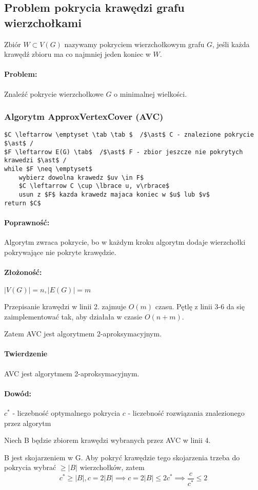 \subsection{Problem pokrycia krawędzi grafu wierzchołkami}
Zbiór $W \subset V(G)$ nazywamy pokryciem wierzchołkowym grafu $G$, jeśli każda krawędź zbioru ma co najmniej jeden koniec w $W$.

\paragraph{Problem: }Znaleźć pokrycie wierzchołkowe $G$ o minimalnej wielkości.

\subsubsection{Algorytm ApproxVertexCover (AVC)}
\begin{lstlisting}[caption={AVC(G)}]
$C \leftarrow \emptyset \tab \tab $  /$\ast$ C - znalezione pokrycie $\ast$ /
$F \leftarrow E(G) \tab$  /$\ast$ F - zbior jeszcze nie pokrytych krawedzi $\ast$ /
while $F \neq \emptyset$
	wybierz dowolna krawedz $uv \in F$
	$C \leftarrow C \cup \lbrace u, v\rbrace$
	usun z $F$ kazda krawedz majaca koniec w $u$ lub $v$
return $C$
\end{lstlisting}

\paragraph{Poprawność: } Algorytm zwraca pokrycie, bo w każdym kroku algorytm dodaje wierzchołki pokrywające nie pokryte krawędzie.

\paragraph{Złożoność: } $|V(G)| =  n, |E(G)| = m$

Przepisanie krawędzi w linii 2. zajmuje $O(m)$ czasu.
Pętlę z linii 3-6 da się zaimplementować tak, aby działała w czasie $O(n+m)$.

Zatem AVC jest algorytmem 2-aproksymacyjnym.

\paragraph{Twierdzenie }AVC jest algorytmem 2-aproksymacyjnym.

\paragraph{Dowód:}
$c^{\ast}$ - liczebność optymalnego pokrycia
$c$ - liczebność rozwiązania znalezionego przez algorytm

Niech B będzie zbiorem krawędzi wybranych przez AVC w linii 4.

B jest skojarzeniem w G. Aby pokryć krawędzie tego skojarzenia trzeba do pokrycia wybrać $\geq \vert B\vert$ wierzchołków, zatem $$c^{\ast} \geq \vert B \vert, c = 2\vert B\vert \implies c = 2\vert B\vert \leq 2c^{\ast} \implies \frac{c}{c^{\ast}} \leq 2$$
